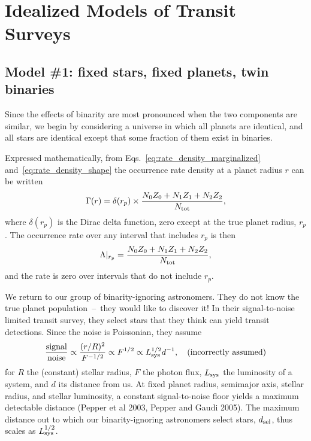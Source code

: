 \section{Idealized Models of Transit Surveys}

\subsection{Model \#1: fixed stars, fixed planets, twin binaries}
\label{sec:model_1}

Since the effects of binarity are most pronounced when the two components are 
similar, we begin by considering a universe in which all planets are 
identical, and all stars are identical except that some fraction of them exist 
in binaries.

Expressed mathematically, from Eqs.~\ref{eq:rate_density_marginalized}
and~\ref{eq:rate_density_shape} the occurrence rate density at a planet radius 
$r$ can be written
\begin{equation}
\Gamma(r) = \delta(r_p) \times
\frac{
    N_0 Z_0 +
    N_1 Z_1 +
    N_2 Z_2
}{N_{\rm tot}},
\label{eq:model_1_rate_density}
\end{equation}
where $\delta(r_p)$ is the Dirac delta function, zero except at the true 
planet radius, $r_p$.
The occurrence rate over any interval that includes $r_p$ is then
\begin{equation}
\Lambda|_{r_p} = \frac{
    N_0 Z_0 +
    N_1 Z_1 +
    N_2 Z_2 
}{N_{\rm tot}},
\label{eq:model_1_rate}
\end{equation}
and the rate is zero over intervals that do not include $r_p$.

We return to our group of binarity-ignoring astronomers. They do 
not know the true planet population~--~they would like to discover it!
In their signal-to-noise limited transit survey, they select stars 
that they think can yield transit detections.
Since the noise is Poissonian, they assume
\begin{equation}
\frac{{\rm signal}}{{\rm noise}}
\propto \frac{(r/R)^2}{F^{-1/2}}
\propto F^{1/2}
\propto L_{\rm sys}^{1/2} d^{-1}, \quad ({\rm incorrectly\ assumed})
\end{equation}
for $R$ the (constant) stellar radius, $F$ the photon flux, $L_{\rm sys}$ the 
luminosity of a system, and $d$ its distance from us.
At fixed planet radius, semimajor axis, stellar radius, and stellar luminosity,
a constant signal-to-noise floor yields a maximum detectable 
distance (Pepper et al 2003, Pepper and Gaudi 2005).
The maximum distance out to which our binarity-ignoring astronomers 
select stars, $d_{\rm sel}$, thus scales as $L_{\rm sys}^{1/2}$.

